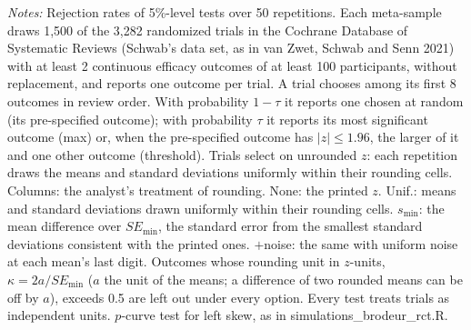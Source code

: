 \begin{table}[htbp]
\begin{minipage}{\linewidth}\footnotesize\textit{Notes:} Rejection rates of 5\%-level tests over 50 repetitions. Each meta-sample draws 1{,}500 of the 3{,}282 randomized trials in the Cochrane Database of Systematic Reviews (Schwab's data set, as in van Zwet, Schwab and Senn 2021) with at least 2 continuous efficacy outcomes of at least 100 participants, without replacement, and reports one outcome per trial. A trial chooses among its first 8 outcomes in review order. With probability $1 - \tau$ it reports one chosen at random (its pre-specified outcome); with probability $\tau$ it reports its most significant outcome (max) or, when the pre-specified outcome has $|z| \le 1.96$, the larger of it and one other outcome (threshold). Trials select on unrounded $z$: each repetition draws the means and standard deviations uniformly within their rounding cells. Columns: the analyst's treatment of rounding. None: the printed $z$. Unif.: means and standard deviations drawn uniformly within their rounding cells. $s_{\min}$: the mean difference over $SE_{\min}$, the standard error from the smallest standard deviations consistent with the printed ones. $+$noise: the same with uniform noise at each mean's last digit. Outcomes whose rounding unit in $z$-units, $\kappa = 2a/SE_{\min}$ ($a$ the unit of the means; a difference of two rounded means can be off by $a$), exceeds 0.5 are left out under every option. Every test treats trials as independent units. $p$-curve test for left skew, as in simulations\_brodeur\_rct.R.\end{minipage}
\end{table}
